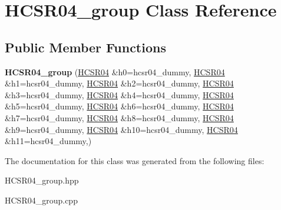 \hypertarget{class_h_c_s_r04__group}{}\section{H\+C\+S\+R04\+\_\+group Class Reference}
\label{class_h_c_s_r04__group}
\subsection*{Public Member Functions}
\begin{DoxyCompactItemize}
\item 
\mbox{\label{class_h_c_s_r04__group_a36028da8edcd0e65d5d6f4721c3a143d}} 
{\bfseries H\+C\+S\+R04\+\_\+group} (\hyperlink{class_h_c_s_r04}{H\+C\+S\+R04} \&h0=hcsr04\+\_\+dummy, \hyperlink{class_h_c_s_r04}{H\+C\+S\+R04} \&h1=hcsr04\+\_\+dummy, \hyperlink{class_h_c_s_r04}{H\+C\+S\+R04} \&h2=hcsr04\+\_\+dummy, \hyperlink{class_h_c_s_r04}{H\+C\+S\+R04} \&h3=hcsr04\+\_\+dummy, \hyperlink{class_h_c_s_r04}{H\+C\+S\+R04} \&h4=hcsr04\+\_\+dummy, \hyperlink{class_h_c_s_r04}{H\+C\+S\+R04} \&h5=hcsr04\+\_\+dummy, \hyperlink{class_h_c_s_r04}{H\+C\+S\+R04} \&h6=hcsr04\+\_\+dummy, \hyperlink{class_h_c_s_r04}{H\+C\+S\+R04} \&h7=hcsr04\+\_\+dummy, \hyperlink{class_h_c_s_r04}{H\+C\+S\+R04} \&h8=hcsr04\+\_\+dummy, \hyperlink{class_h_c_s_r04}{H\+C\+S\+R04} \&h9=hcsr04\+\_\+dummy, \hyperlink{class_h_c_s_r04}{H\+C\+S\+R04} \&h10=hcsr04\+\_\+dummy, \hyperlink{class_h_c_s_r04}{H\+C\+S\+R04} \&h11=hcsr04\+\_\+dummy,)
\end{DoxyCompactItemize}


The documentation for this class was generated from the following files\+:\begin{DoxyCompactItemize}
\item 
H\+C\+S\+R04\+\_\+group.\+hpp\item 
H\+C\+S\+R04\+\_\+group.\+cpp\end{DoxyCompactItemize}
